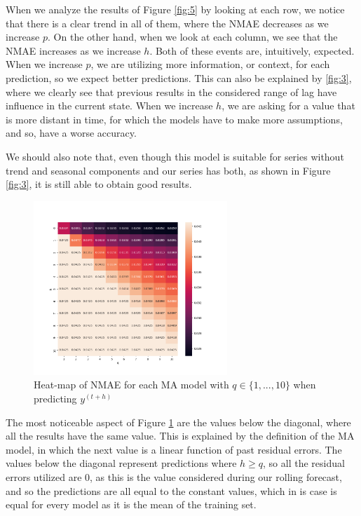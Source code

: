 \documentclass[10pt]{article}
\begin{document}
When we analyze the results of Figure \ref{fig:5} by looking at each row, we notice that there is a clear trend in all of them, where the \textsc{NMAE} decreases as we increase $p$. On the other hand, when we look at each column, we see that the \textsc{NMAE} increases as we increase $h$. Both of these events are, intuitively, expected. When we increase $p$, we are utilizing more information, or context, for each prediction, so we expect better predictions. This can also be explained by \ref{fig:3}, where we clearly see that previous results in the considered range of lag have influence in the current state. When we increase $h$, we are asking for a value that is more distant in time, for which the models have to make more assumptions, and so, have a worse accuracy.

We should also note that, even though this model is suitable for series without trend and seasonal components and our series has both, as shown in Figure \ref{fig:3}, it is still able to obtain good results.

\pagebreak

\begin{figure}[h!]
    \centering
    \includegraphics[width=0.65\textwidth,height=\textheight,keepaspectratio]{../ma_nmae_heatmap.png}
    \caption{Heat-map of \textsc{NMAE} for each MA model with $q\in\{1,...,10\}$ when predicting $y^{(t+h)}$}
    \label{fig:6}
\end{figure}

The most noticeable aspect of Figure \ref{fig:6} are the values below the diagonal, where all the results have the same value. This is explained by the definition of the MA model, in which the next value is a linear function of past residual errors. The values below the diagonal represent predictions where $h \geq q$, so all the residual errors utilized are $0$, as this is the value considered during our rolling forecast, and so the predictions are all equal to the constant values, which in is case is equal for every model as it is the mean of the training set.
\end{document}
